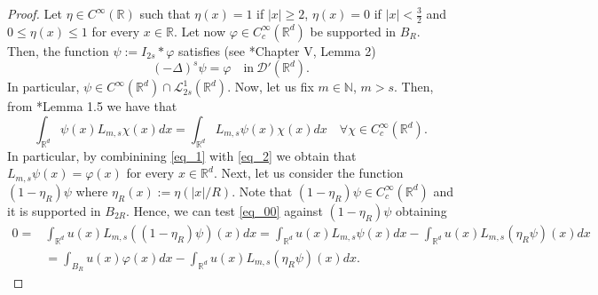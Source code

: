 \documentclass[letterpaper, 11pt,  reqno]{amsart}
\theoremstyle{definition}
\theoremstyle{remark}
\numberwithin{equation}{section}
\newcommand{\N}{{\mathbb N}}
\newcommand{\R}{{\mathbb R}}
\begin{document}
	\begin{proof}
		Let $\eta\in C^{\infty}(\R)$ such that $\eta(x)=1$ if $|x|\ge 2$, $\eta(x)=0$ if $|x|<\frac{3}{2}$ and $0\le \eta(x)\le 1$ for every $x\in \R$. Let now $\varphi\in C^{\infty}_c(\R^d)$ be supported in $B_{R}$. Then, the function  $\psi:=I_{2s}*\varphi$ satisfies (see \cite{Stein}*{Chapter V, Lemma 2})
		\begin{equation}\label{eq_1}
			(-\Delta)^{s}\psi=\varphi\quad \text{in}\ \mathscr{D}'(\R^d). 
		\end{equation}
		In particular, $\psi\in C^{\infty}(\R^d)\cap \mathscr{L}^{1}_{2s}(\R^d)$.
		Now, let us fix $m\in \N$, $m>s$. Then, from \cite{Abatangelo_2}*{Lemma 1.5} we have that 
		\begin{equation}\label{eq_2}
			\int_{\R^d}\psi(x)L_{m,s}\chi(x)dx=\int_{\R^d}L_{m,s}\psi(x)\chi(x)dx\quad \forall \chi\in C^{\infty}_c(\R^d).
		\end{equation}
		In particular, by combinining \eqref{eq_1} with \eqref{eq_2} we obtain that 
		$L_{m,s}\psi(x)=\varphi(x)$ for every $x\in \R^d$.
		Next, let us consider the function $(1-\eta_R)\psi$ where $\eta_R(x):=\eta(|x|/R)$. Note that $(1-\eta_R)\psi\in C^{\infty}_c(\R^d)$ and it is supported in $B_{2R}$. Hence, we can  test \eqref{eq_00} against $(1-\eta_R)\psi$ obtaining 
		\begin{equation}\label{eq_3}
			\begin{split}
				0\!=\!& \int_{\R^d}u(x)L_{m,s}((1-\eta_R)\psi)(x)dx \!=\!\int_{\R^d}u(x)L_{m,s}\psi(x)dx \!-\!\!\int_{\R^d}u(x)L_{m,s} (\eta_R\psi)(x)dx\\
				&{=} \int_{B_{R}}u(x)\varphi(x)dx-\int_{\R^d}u(x)L_{m,s} (\eta_R \psi)(x)dx.
			\end{split}
		\end{equation}
	

\end{proof}
\end{document}
